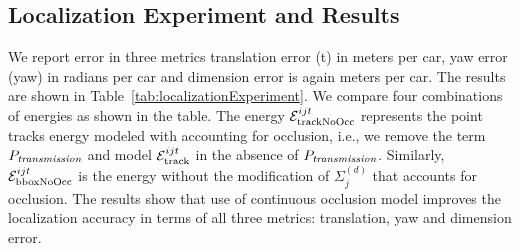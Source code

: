 \subsection{Localization Experiment and Results}
We report error in three metrics translation error (t) in meters per car, yaw
error (yaw) in radians per car and dimension error is again meters per car. The
results are shown in Table~\ref{tab:localizationExperiment}.  We compare four
combinations of energies as shown in the table.  The energy $\mathcal{E}^{ijt}_{\text{trackNoOcc}}$
represents the point tracks energy modeled with accounting for occlusion, i.e.,
we remove the term $P_{\textit{transmission}}$ and model $\mathcal{E}^{ijt}_{\text{track}}$ in the absence of
$P_{\textit{transmission}}$. Similarly, $\mathcal{E}^{ijt}_{\text{bboxNoOcc}}$ is the energy without the
modification of $\Sigma^{(d)}_j$ that accounts for occlusion.  The results show that
use of continuous occlusion model improves the localization accuracy in terms
of all three metrics: translation, yaw and dimension error.

